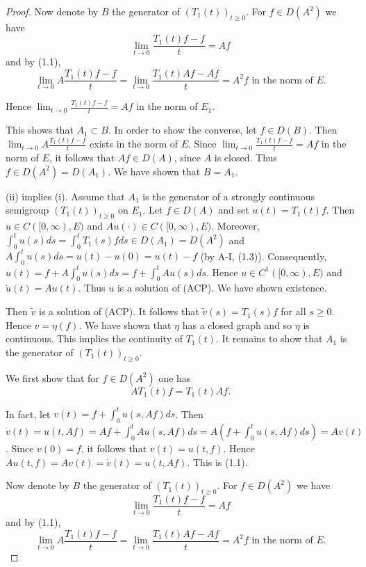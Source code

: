 \begin{proof}
Now denote by $B$ the generator of $(T_{1}(t))_{t\geq0}$.
For $f \in D(A^{2})$ we have
\[
\lim_{t \to 0} \frac{T_{1}(t)f - f}{t} = Af
\]
and by (1.1),
\[
\lim_{t \to 0} A \frac{T_{1}(t)f - f}{t} = \lim_{t \to 0} \frac{T_{1}(t)Af - Af}{t} = A^{2}f \text{ in the norm of } E.
\]

Hence $\lim_{t \to 0} \frac{T_{1}(t)f - f}{t} = Af$ in the norm of $E_{1}$.

This shows that $A_{1} \subset B$.
In order to show the converse, let $f \in D(B)$.
Then $\lim_{t \to 0} A \frac{T_{1}(t)f - f}{t}$ exists in the norm of $E$.
Since $\lim_{t \to 0} \frac{T_{1}(t)f - f}{t} = Af$ in the norm of $E$, it follows that $Af \in D(A)$, since $A$ is closed.
Thus $f \in D(A^{2}) = D(A_{1})$.
We have shown that $B = A_{1}$.

(ii) implies (i).
Assume that $A_{1}$ is the generator of a strongly continuous semigroup $(T_{1}(t))_{t\geq0}$ on $E_{1}$.
Let $f \in D(A)$ and set $u(t) = T_{1}(t)f$.
Then $u \in C([0,\infty),E)$ and $Au(\cdot) \in C([0,\infty),E)$.
Moreover, $\int_{0}^{t} u(s)ds = \int_{0}^{t} T_{1}(s)fds \in D(A_{1}) = D(A^{2})$ and $A\int_{0}^{t} u(s)ds = u(t) - u(0) = u(t) - f$ (by A-I, (1.3)).
Consequently, $u(t) = f + A\int_{0}^{t} u(s)ds = f + \int_{0}^{t} Au(s)ds$.
Hence $u \in C^{1}([0,\infty),E)$ and $\dot{u}(t) = Au(t)$.
Thus $u$ is a solution of (ACP).
We have shown existence.


Then $\tilde{v}$ is a solution of (ACP).
It follows that $\tilde{v}(s) = T_{1}(s)f$ for all $s \geq 0$.
Hence $v = \eta(f)$.
We have shown that $\eta$ has a closed graph and so $\eta$ is continuous.
This implies the continuity of $T_{1}(t)$.
It remains to show that $A_{1}$ is the generator of $(T_{1}(t))_{t\geq0}$.

We first show that for $f \in D(A^{2})$ one has
\[
AT_{1}(t)f = T_{1}(t)Af. \tag{1.1}
\]

In fact, let $v(t) = f + \int_{0}^{t} u(s,Af) ds$.
Then $\dot{v}(t) = u(t,Af) = Af + \int_{0}^{t} Au(s,Af) ds = A(f + \int_{0}^{t} u(s,Af) ds) = Av(t)$.
Since $v(0) = f$, it follows that $v(t) = u(t,f)$.
Hence $Au(t,f) = Av(t) = \dot{v}(t) = u(t,Af)$.
This is (1.1).

Now denote by $B$ the generator of $(T_{1}(t))_{t\geq0}$.
For $f \in D(A^{2})$ we have
\[
\lim_{t \to 0} \frac{T_{1}(t)f - f}{t} = Af
\]
and by (1.1),
\[
\lim_{t \to 0} A \frac{T_{1}(t)f - f}{t} = \lim_{t \to 0} \frac{T_{1}(t)Af - Af}{t} = A^{2}f \text{ in the norm of } E.
\]


\end{proof}
